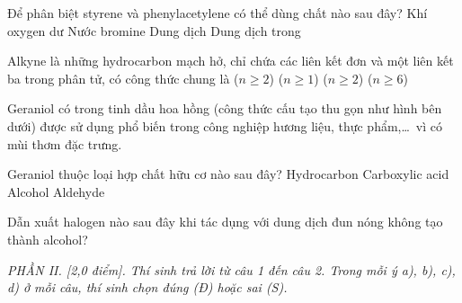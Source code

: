 \documentclass[12pt,a4paper]{article}
\begin{document}
\begin{ex}
Để phân biệt styrene và phenylacetylene có thể dùng chất nào sau đây?
\choice
{Khí oxygen dư}
{Nước bromine}
{Dung dịch }
{\True Dung dịch  trong }
\loigiai{}
\end{ex}

\begin{ex}
Alkyne là những hydrocarbon mạch hở, chỉ chứa các liên kết đơn và một liên kết ba  trong phân tử, có công thức chung là
\choice
{\True {} ($n \ge 2$)}
{ ($n \ge 1$)}
{ ($n \ge 2$)}
{ ($n \ge 6$)}
\loigiai{}
\end{ex}

\begin{ex}
Geraniol có trong tinh dầu hoa hồng (công thức cấu tạo thu gọn như hình bên dưới) được sử dụng phổ biến trong công nghiệp hương liệu, thực phẩm,\dots\ vì có mùi thơm đặc trưng.
\begin{center}
\end{center}
Geraniol thuộc loại hợp chất hữu cơ nào sau đây?
\choice
{Hydrocarbon}
{Carboxylic acid}
{\True Alcohol}
{Aldehyde}
\loigiai{}
\end{ex}

\begin{ex}
Dẫn xuất halogen nào sau đây khi tác dụng với dung dịch  đun nóng không tạo thành alcohol?
\choice
{\True {}}
{}
{}
{}
\loigiai{}
\end{ex}

\begin{flushleft}
	{\color{blue!50!green}}
\end{flushleft}
\setcounter{ex}{0}
\setcounter{bt}{0}

\textit{PHẦN II. [2,0 điểm]. Thí sinh trả lời từ câu 1 đến câu 2. Trong mỗi ý a), b), c), d) ở mỗi câu, thí sinh chọn đúng (Đ) hoặc sai (S).}
\end{document}
